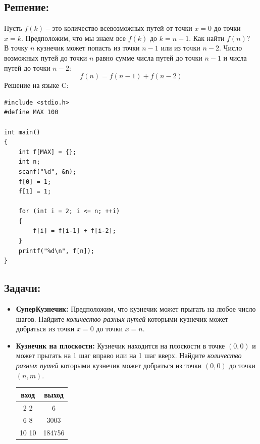 \documentclass{article}
\begin{document}
\subsection*{Решение:}
Пусть $f(k)$ -- это количество всевозможных путей от точки $x = 0$ до точки $x = k$. Предположим, что мы знаем все $f(k)$ до $k = n - 1$. Как найти $f(n)$?\\
В точку $n$ кузнечик может попасть из точки $n - 1$ или из точки $n - 2$. Число возможных путей до точки $n$ равно сумме числа путей до точки $n - 1$ и числа путей до точки $n - 2$:
$$
f(n) = f(n-1) + f(n-2)
$$
Решение на языке C:
\begin{lstlisting}
#include <stdio.h>
#define MAX 100

int main()
{
	int f[MAX] = {};
	int n;
	scanf("%d", &n);
	f[0] = 1;
	f[1] = 1;

	for (int i = 2; i <= n; ++i)
	{
		f[i] = f[i-1] + f[i-2];
	}
	printf("%d\n", f[n]);
}
\end{lstlisting}

\subsection*{Задачи:}
\begin{itemize}
\item \textbf{СуперКузнечик:} Предположим, что кузнечик может прыгать на любое число шагов. Найдите \textit{количество разных путей} которыми кузнечик может добраться из точки $x = 0$ до точки $x = n$.

\item \textbf{Кузнечик на плоскости:} Кузнечик находится на плоскости в точке $(0, 0)$ и может прыгать на 1 шаг вправо или на 1 шаг вверх. Найдите \textit{количество разных путей} которыми кузнечик может добраться из точки $(0, 0)$ до точки $(n, m)$.
\begin{center}
\begin{tabular}{ c | c }
 вход & выход \\ \hline
 2 2 & 6  \\ 
 6 8 & 3003  \\ 
 10 10 & 184756  \\ 
\end{tabular}
\end{center}
\end{itemize}
\end{document}
